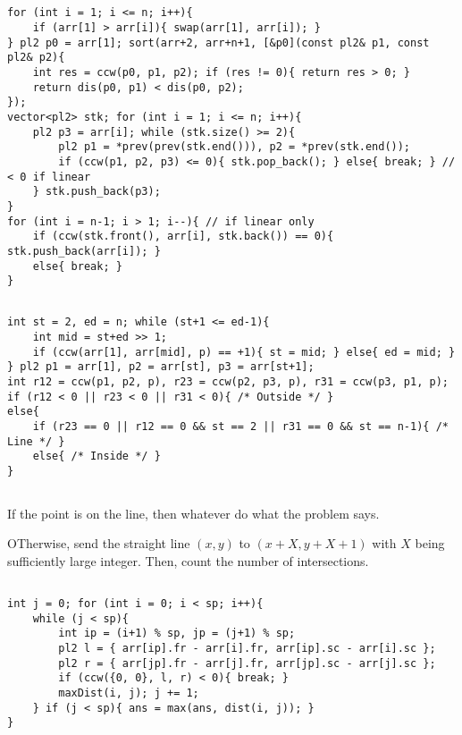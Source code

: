 \documentclass[landscape, 8pt, a4paper, oneside, twocolumn]{extarticle}
\begin{document}
\subsection{}
\begin{verbatim}
for (int i = 1; i <= n; i++){
    if (arr[1] > arr[i]){ swap(arr[1], arr[i]); }
} pl2 p0 = arr[1]; sort(arr+2, arr+n+1, [&p0](const pl2& p1, const pl2& p2){
    int res = ccw(p0, p1, p2); if (res != 0){ return res > 0; }
    return dis(p0, p1) < dis(p0, p2);
});
vector<pl2> stk; for (int i = 1; i <= n; i++){
    pl2 p3 = arr[i]; while (stk.size() >= 2){
        pl2 p1 = *prev(prev(stk.end())), p2 = *prev(stk.end());
        if (ccw(p1, p2, p3) <= 0){ stk.pop_back(); } else{ break; } // < 0 if linear
    } stk.push_back(p3);
}
for (int i = n-1; i > 1; i--){ // if linear only
    if (ccw(stk.front(), arr[i], stk.back()) == 0){ stk.push_back(arr[i]); }
    else{ break; }
}
\end{verbatim}
\subsection{}
\begin{verbatim}
int st = 2, ed = n; while (st+1 <= ed-1){
    int mid = st+ed >> 1;
    if (ccw(arr[1], arr[mid], p) == +1){ st = mid; } else{ ed = mid; }
} pl2 p1 = arr[1], p2 = arr[st], p3 = arr[st+1];
int r12 = ccw(p1, p2, p), r23 = ccw(p2, p3, p), r31 = ccw(p3, p1, p);
if (r12 < 0 || r23 < 0 || r31 < 0){ /* Outside */ }
else{
    if (r23 == 0 || r12 == 0 && st == 2 || r31 == 0 && st == n-1){ /* Line */ }
    else{ /* Inside */ }
}
\end{verbatim}
\subsection{}
If the point is on the line, then whatever do what the problem says.

OTherwise, send the straight line $(x, y)$ to $(x+X, y+X+1)$ with $X$ being sufficiently large integer. Then, count the number of intersections.
\subsection{}
\begin{verbatim}
int j = 0; for (int i = 0; i < sp; i++){
    while (j < sp){
        int ip = (i+1) % sp, jp = (j+1) % sp;
        pl2 l = { arr[ip].fr - arr[i].fr, arr[ip].sc - arr[i].sc };
        pl2 r = { arr[jp].fr - arr[j].fr, arr[jp].sc - arr[j].sc };
        if (ccw({0, 0}, l, r) < 0){ break; }
        maxDist(i, j); j += 1;
    } if (j < sp){ ans = max(ans, dist(i, j)); }
}
\end{verbatim}
\end{document}
